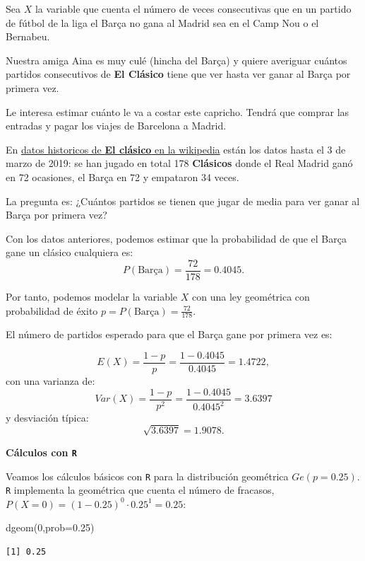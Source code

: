 \documentclass[
  letterpaper,
  DIV=11,
  numbers=noendperiod]{scrreprt}
\newenvironment{Shaded}{\begin{snugshade}}{\end{snugshade}}
\newcommand{\AttributeTok}[1]{\textcolor[rgb]{0.40,0.45,0.13}{#1}}
\newcommand{\DecValTok}[1]{\textcolor[rgb]{0.68,0.00,0.00}{#1}}
\newcommand{\FloatTok}[1]{\textcolor[rgb]{0.68,0.00,0.00}{#1}}
\newcommand{\FunctionTok}[1]{\textcolor[rgb]{0.28,0.35,0.67}{#1}}
\newcommand{\NormalTok}[1]{\textcolor[rgb]{0.00,0.23,0.31}{#1}}
\begin{document}
Sea \(X\) la variable que cuenta el número de veces consecutivas que en
un partido de fútbol de la liga el Barça no gana al Madrid sea en el
Camp Nou o el Bernabeu.

Nuestra amiga Aina es muy culé (hincha del Barça) y quiere averiguar
cuántos partidos consecutivos de \textbf{El Clásico} tiene que ver hasta
ver ganar al Barça por primera vez.

Le interesa estimar cuánto le va a costar este capricho. Tendrá que
comprar las entradas y pagar los viajes de Barcelona a Madrid.

En \href{https://es.wikipedia.org/wiki/El_Cl\%C3\%A1sico}{datos
historicos de \textbf{El clásico} en la wikipedia} están los datos hasta
el 3 de marzo de 2019: se han jugado en total 178 \textbf{Clásicos}
donde el Real Madrid ganó en 72 ocasiones, el Barça en 72 y empataron 34
veces.

La pregunta es: ¿Cuántos partidos se tienen que jugar de media para ver
ganar al Barça por primera vez?

Con los datos anteriores, podemos estimar que la probabilidad de que el
Barça gane un clásico cualquiera es:
\[P(\mbox{Barça})=\frac{72}{178}=0.4045.\]

Por tanto, podemos modelar la variable \(X\) con una ley geométrica con
probabilidad de éxito \(p=P(\mbox{Barça})=\frac{72}{178}.\)

El número de partidos esperado para que el Barça gane por primera vez
es:

\[E(X)=\frac{1-p}{p}=\frac{1-0.4045}{0.4045}=1.4722,\] con una varianza
de: \[Var(X)=\frac{1-p}{p^2}=\frac{1-0.4045}{0.4045^2}=3.6397\] y
desviación típica: \[\sqrt{3.6397}=1.9078.\]

\textbf{Cálculos con \texttt{R}}

Veamos los cálculos básicos con \texttt{R} para la distribución
geométrica \(Ge(p=0.25)\). \texttt{R} implementa la geométrica que
cuenta el número de fracasos, \(P(X=0)=(1-0.25)^0\cdot 0.25^1=0.25\):

\begin{Shaded}
\begin{Highlighting}[]
\FunctionTok{dgeom}\NormalTok{(}\DecValTok{0}\NormalTok{,}\AttributeTok{prob=}\FloatTok{0.25}\NormalTok{)}
\end{Highlighting}
\end{Shaded}

\begin{verbatim}
[1] 0.25
\end{verbatim}
\end{document}
